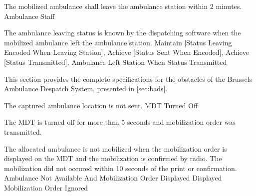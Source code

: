   \startkaosspec
  	 {The mobilized ambulance shall leave the ambulance station within 2 minutes.}
  	 {Ambulance Staff}
  \stopkaosspec
  
  \startkaosspec
  	 {The ambulance leaving status is known by the dispatching software when the mobilized ambulance left the ambulance station.}
  	 {Maintain [Status Leaving Encoded When Leaving Station], Achieve [Status Sent When Encoded], Achieve [Status Transmitted], Ambulance Left Station When Status Transmitted}
  \stopkaosspec
  
\stopsubsection

\startsubsection[title={Obstacle specifications}]

  This section provides the complete specifications for the obstacles of the
  Brussels Ambulance Despatch System, presented in [sec:bads].

  
    {}
  
  \startkaosspec
  	 {The captured ambulance location is not sent.}
  	 {MDT Turned Off}
  \stopkaosspec

  \startkaosspec
  	 {The MDT is turned off for more than 5 seconds and mobilization order was transmitted.}
  \stopkaosspec
  
  
    {}
  
  \startkaosspec
  	 {The allocated ambulance is not mobilized when the mobilization order is displayed on the MDT and the mobilization is confirmed by radio. The mobilization did not occured within 10 seconds of the print or confirmation.}
  	 {Ambulance Not Available And Mobilization Order Displayed}
  	 {Displayed Mobilization Order Ignored}
  \stopkaosspec
  
